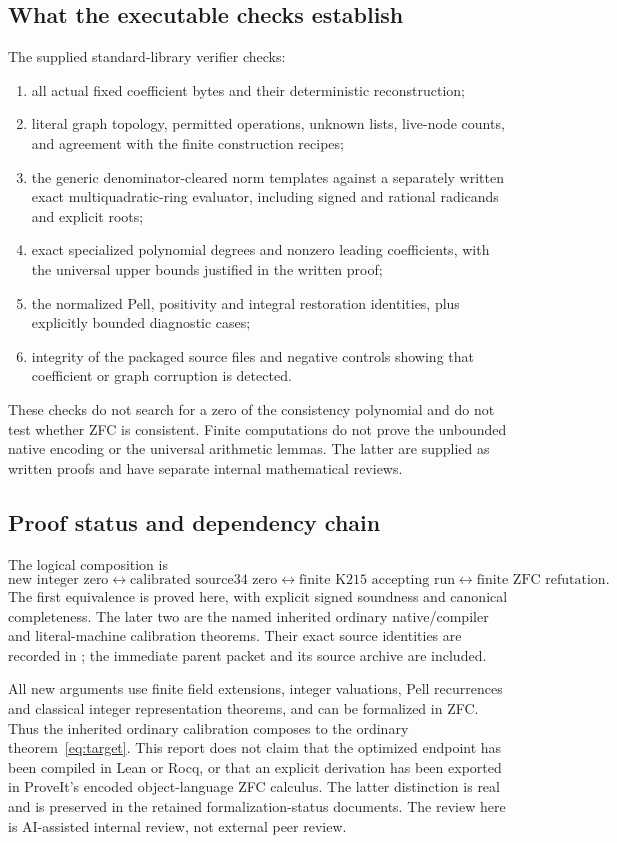 \documentclass[11pt]{article}
\theoremstyle{remark}\newtheorem{remark}[theorem]{Remark}
\newcommand{\file}[1]{\path{#1}}
\begin{document}
\subsection{What the executable checks establish}
The supplied standard-library verifier checks:
\begin{enumerate}
\item all actual fixed coefficient bytes and their deterministic reconstruction;
\item literal graph topology, permitted operations, unknown lists, live-node
      counts, and agreement with the finite construction recipes;
\item the generic denominator-cleared norm templates against a separately
      written exact multiquadratic-ring evaluator, including signed and
      rational radicands and explicit roots;
\item exact specialized polynomial degrees and nonzero leading coefficients,
      with the universal upper bounds justified in the written proof;
\item the normalized Pell, positivity and integral restoration identities,
      plus explicitly bounded diagnostic cases;
\item integrity of the packaged source files and negative controls showing
      that coefficient or graph corruption is detected.
\end{enumerate}
These checks do not search for a zero of the consistency polynomial and do
not test whether ZFC is consistent. Finite computations do not prove the
unbounded native encoding or the universal arithmetic lemmas. The latter
are supplied as written proofs and have separate internal mathematical
reviews.

\subsection{Proof status and dependency chain}
The logical composition is
\[
 \text{new integer zero}
 \longleftrightarrow\text{calibrated source34 zero}
 \longleftrightarrow\text{finite K215 accepting run}
 \longleftrightarrow\text{finite ZFC refutation}.
\]
The first equivalence is proved here, with explicit signed soundness and
canonical completeness. The later two are the named inherited ordinary
native/compiler and literal-machine calibration theorems. Their exact
source identities are recorded in \file{SOURCE_PINS.json}; the immediate
parent packet and its source archive are included.

All new arguments use finite field extensions, integer valuations, Pell
recurrences and classical integer representation theorems, and can be
formalized in ZFC. Thus the inherited ordinary calibration composes to the
ordinary theorem~\eqref{eq:target}. This report does not claim that the
optimized endpoint has been compiled in Lean or Rocq, or that an explicit
derivation has been exported in ProveIt's encoded object-language ZFC
calculus. The latter distinction is real and is preserved in the retained
formalization-status documents. The review here is AI-assisted internal
review, not external peer review.
\end{document}
